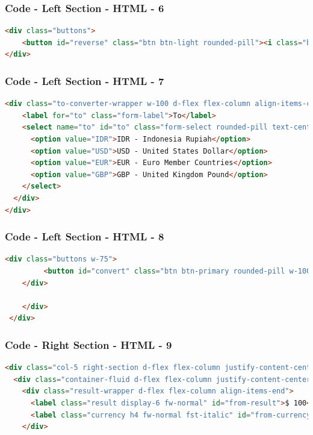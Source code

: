 \documentclass[aspectratio=169, table]{beamer}
\begin{document}
\begin{frame}[fragile]
    \frametitle{Code - Left Section - HTML - 6}
    \vskip1cm
    \begin{lstlisting}[language=HTML]
<div class="buttons">
    <button id="reverse" class="btn btn-light rounded-pill"><i class="bi bi-arrow-down-up"></i></button>
</div>
    \end{lstlisting}
\end{frame}

\begin{frame}[fragile]
    \frametitle{Code - Left Section - HTML - 7}
    \vskip1cm
    \begin{lstlisting}[language=HTML]
<div class="to-converter-wrapper w-100 d-flex flex-column align-items-center justify-content-center">
    <label for="to" class="form-label">To</label>
    <select name="to" id="to" class="form-select rounded-pill text-center w-75">
      <option value="IDR">IDR - Indonesia Rupiah</option>
      <option value="USD">USD - United States Dollar</option>
      <option value="EUR">EUR - Euro Member Countries</option>
      <option value="GBP">GBP - United Kingdom Pound</option>
    </select>
  </div>
</div>
    \end{lstlisting}
\end{frame}


\begin{frame}[fragile]
    \frametitle{Code - Left Section - HTML - 8}
    \vskip1cm
    \begin{lstlisting}[language=HTML]
	<div class="buttons w-75">
	     <button id="convert" class="btn btn-primary rounded-pill w-100">Convert</button>
	</div>

    </div>
 </div>
    \end{lstlisting}
\end{frame}

\begin{frame}[fragile]
    \frametitle{Code - Right Section - HTML - 9}
    \vskip1cm
    \begin{lstlisting}[language=HTML]
<div class="col-5 right-section d-flex flex-column justify-content-center text-light">
  <div class="container-fluid d-flex flex-column justify-content-center text-light">
    <div class="result-wrapper d-flex flex-column align-items-end">
      <label class="result display-6 fw-normal" id="from-result">$ 100</label>
      <label class="currency h4 fw-normal fst-italic" id="from-currency">USD</label>
    </div>
    \end{lstlisting}
\end{frame}
\end{document}
